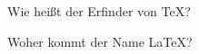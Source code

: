\documentclass[12pt]{article}
\begin{document}
   Wie heißt der Erfinder von \TeX?

   Woher kommt der Name \LaTeX?
\end{document}
